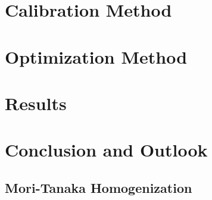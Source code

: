 \documentclass[pdflatex,sn-basic]{template/sn-jnl}%
\begin{document}
\section{Calibration Method}\label{sec:calibration}


\section{Optimization Method}\label{sec:optimization}


\section{Results}\label{sec:results}


\section{Conclusion and Outlook}\label{sec:results}




\begin{appendices}
\section{Mori-Tanaka Homogenization}\label{appendix:hom}


\end{appendices}



\end{document}

